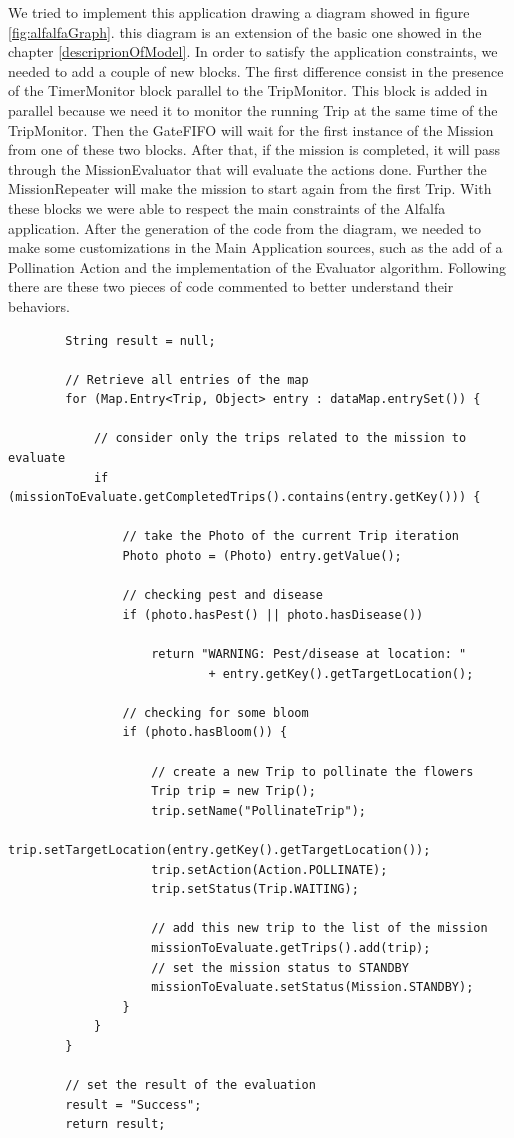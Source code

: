 We tried to implement this application drawing a diagram showed in figure \ref{fig:alfalfaGraph}. this diagram is an extension of the basic one showed in the chapter \ref{descriprionOfModel}. In order to satisfy the application constraints, we needed to add a couple of new blocks. The first difference consist in the presence of the TimerMonitor block parallel to the TripMonitor. This block is added in parallel because we need it to monitor the running Trip at the same time of the TripMonitor. Then the GateFIFO will wait for the first instance of the Mission from one of these two blocks. After that, if the mission is completed, it will pass through the MissionEvaluator that will evaluate the actions done. Further the MissionRepeater will make the mission to start again from the first Trip. With these blocks we were able to respect the main constraints of the Alfalfa\cite{alfalfa} application. After the generation of the code from the diagram, we needed to make some customizations in the Main Application sources, such as the add of a Pollination Action and the implementation of the Evaluator algorithm. Following there are these two pieces of code commented to better understand their behaviors.

\begin{lstlisting}
		String result = null;

		// Retrieve all entries of the map
		for (Map.Entry<Trip, Object> entry : dataMap.entrySet()) {

			// consider only the trips related to the mission to evaluate
			if (missionToEvaluate.getCompletedTrips().contains(entry.getKey())) {
				
				// take the Photo of the current Trip iteration
				Photo photo = (Photo) entry.getValue();
				
				// checking pest and disease
				if (photo.hasPest() || photo.hasDisease())
					
					return "WARNING: Pest/disease at location: "
							+ entry.getKey().getTargetLocation();

				// checking for some bloom
				if (photo.hasBloom()) {

					// create a new Trip to pollinate the flowers
					Trip trip = new Trip();
					trip.setName("PollinateTrip");
					trip.setTargetLocation(entry.getKey().getTargetLocation());
					trip.setAction(Action.POLLINATE);
					trip.setStatus(Trip.WAITING);

					// add this new trip to the list of the mission
					missionToEvaluate.getTrips().add(trip);
					// set the mission status to STANDBY
					missionToEvaluate.setStatus(Mission.STANDBY);
				}
			}
		}

		// set the result of the evaluation
		result = "Success";
		return result;
\end{lstlisting}

